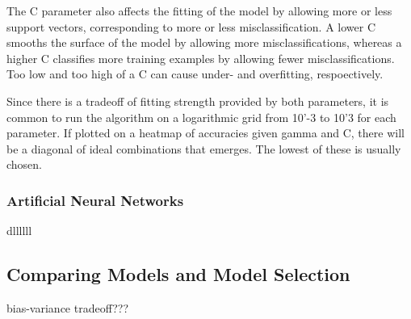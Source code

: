 The C parameter also affects the fitting of the model by allowing more or less
support vectors, corresponding to more or less misclassification. A lower C
smooths the surface of the model by allowing more misclassifications, whereas a
higher C classifies more training examples by allowing fewer
misclassifications. Too low and too high of a C can cause under- and
overfitting, respoectively. 

Since there is a tradeoff of fitting strength provided by both parameters, it
is common to run the algorithm on a logarithmic grid from 10'-3 to 10'3 for
each parameter. If plotted on a heatmap of accuracies given gamma and C, there
will be a diagonal of ideal combinations that emerges. The lowest of these is
usually chosen. 


\subsubsection{Artificial Neural Networks}
\label{sec:neural}

dllllll


\subsection{Comparing Models and Model Selection}
\label{sec:selection}

bias-variance tradeoff???

